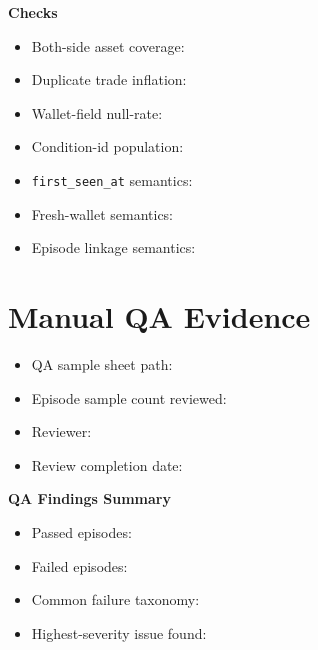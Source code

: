 \documentclass{article}
\begin{document}
\textbf{Checks}
\begin{itemize}
\item Both-side asset coverage: \underline{\hspace{4cm}}
\item Duplicate trade inflation: \underline{\hspace{4cm}}
\item Wallet-field null-rate: \underline{\hspace{4cm}}
\item Condition-id population: \underline{\hspace{4cm}}
\item \texttt{first\_seen\_at} semantics: \underline{\hspace{4cm}}
\item Fresh-wallet semantics: \underline{\hspace{4cm}}
\item Episode linkage semantics: \underline{\hspace{4cm}}
\end{itemize}

\section*{Manual QA Evidence}

\begin{itemize}
\item QA sample sheet path: \underline{\hspace{8cm}}
\item Episode sample count reviewed: \underline{\hspace{8cm}}
\item Reviewer: \underline{\hspace{8cm}}
\item Review completion date: \underline{\hspace{8cm}}
\end{itemize}

\textbf{QA Findings Summary}
\begin{itemize}
\item Passed episodes: \underline{\hspace{4cm}}
\item Failed episodes: \underline{\hspace{4cm}}
\item Common failure taxonomy: \underline{\hspace{8cm}}
\item Highest-severity issue found: \underline{\hspace{8cm}}
\end{itemize}
\end{document}
